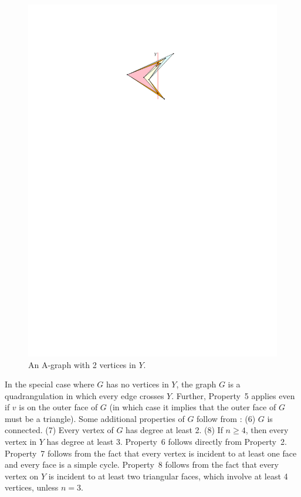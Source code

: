 \begin{figure}
		\vspace{-1mm}
		\centering
		\includegraphics[scale = 0.95]{figs/a-graph-new}
		\caption{An A-graph with 2 vertices in $Y$.}
	\end{figure}
	
In the special case where $G$ has no vertices in $Y$, the graph $G$ is a quadrangulation in which every edge crosses $Y$. Further, Property~5 applies even if $v$ is on the outer face of $G$ (in which case it implies that the outer face of $G$ must be a triangle).
Some additional properties of $G$ follow from : (6) $G$ is connected. (7) Every vertex of $G$ has degree at least 2. (8) If $n\ge 4$, then every vertex in $Y$ has degree at least 3.  Property~6 follows directly from Property~2.
Property~7 follows from the fact that every vertex is incident to at
least one face and every face is a simple cycle.
Property~8 follows from the fact that every vertex on $Y$ is incident
to at least two triangular faces, which involve at least 4 vertices, unless $n=3$.

